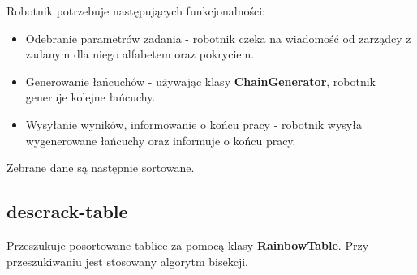 \documentclass[a4paper,11pt]{article}
\begin{document}
Robotnik potrzebuje następujących funkcjonalności:
\begin{itemize}
	\item Odebranie parametrów zadania - robotnik czeka na wiadomość od zarządcy z zadanym dla niego alfabetem oraz pokryciem.
	\item Generowanie łańcuchów - używając klasy \textbf{ChainGenerator}, robotnik generuje kolejne łańcuchy.
	\item Wysyłanie wyników, informowanie o końcu pracy - robotnik wysyła wygenerowane łańcuchy oraz informuje o końcu pracy.
\end{itemize}

Zebrane dane są następnie sortowane.

\subsection{descrack-table}

Przeszukuje posortowane tablice za pomocą klasy \textbf{RainbowTable}. Przy przeszukiwaniu jest stosowany algorytm bisekcji.
\end{document}
